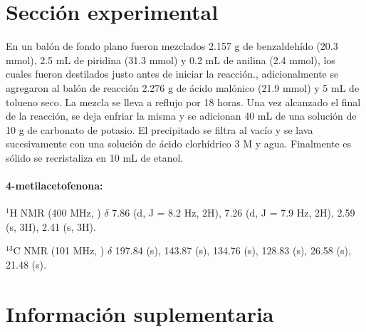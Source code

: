 \documentclass[fleqn,11pt]{SelfArx}
\begin{document}
\section{Secci\'on experimental}
En un balón de fondo plano fueron mezclados 2.157 g de benzaldehído (20.3 mmol), 2.5 mL de piridina (31.3 mmol) y 0.2 mL de anilina (2.4 mmol), los cuales fueron destilados justo antes de iniciar la reacción., adicionalmente se agregaron al balón de reacción 2.276 g de ácido malónico (21.9 mmol) y 5 mL de tolueno seco. La mezcla se lleva a reflujo por 18 horas. Una vez alcanzado el final de la reacción, se deja enfriar la misma y se adicionan 40 mL de una solución de 10 g de carbonato de potasio. El precipitado se filtra al vacío y se lava sucesivamente con una solución de ácido clorhídrico 3 M y agua. Finalmente es sólido se recristaliza en 10 mL de etanol. 

\paragraph{4-metilacetofenona:}
$^1$H NMR (400 MHz, ) $\delta$ 7.86 (d, J = 8.2 Hz, 2H), 7.26 (d, J = 7.9 Hz, 2H), 2.59 (s, 3H), 2.41 (s, 3H).

$^{13}$C NMR (101 MHz, ) $\delta$ 197.84 (s), 143.87 (s), 134.76 (s), 128.83 (s), 26.58 (s), 21.48 (s).

{}



\onecolumn
\section{Informaci\'on suplementaria}\label{sec: complementaria}

\end{document}
